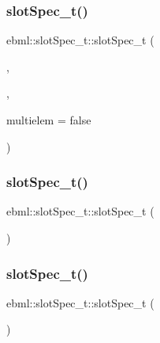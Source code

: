 \mbox{\label{classebml_1_1slotSpec__t_a1d4e4264361ead0bccae5b28c7ba275b}} 
\subsubsection{\texorpdfstring{slot\+Spec\+\_\+t()}{slotSpec\_t()}\hspace{0.1cm}{\footnotesize\ttfamily [2/4]}}
{\footnotesize\ttfamily ebml\+::slot\+Spec\+\_\+t\+::slot\+Spec\+\_\+t (\begin{DoxyParamCaption}\item[{const std\+::string \&}]{,  }\item[{const \mbox{\hyperlink{namespaceebml_abf07998998c284c9be3f76b5d9e192e1}{child\+Class\+Spec\+Arg\+\_\+l}} \&}]{,  }\item[{bool}]{multielem = {\ttfamily false} }\end{DoxyParamCaption})}

\mbox{\label{classebml_1_1slotSpec__t_a98310fdebfa88812dcceaec3af20fe4b}} 
\subsubsection{\texorpdfstring{slot\+Spec\+\_\+t()}{slotSpec\_t()}\hspace{0.1cm}{\footnotesize\ttfamily [3/4]}}
{\footnotesize\ttfamily ebml\+::slot\+Spec\+\_\+t\+::slot\+Spec\+\_\+t (\begin{DoxyParamCaption}\item[{const \mbox{\hyperlink{classebml_1_1slotSpec__t}{slot\+Spec\+\_\+t}} \&}]{ }\end{DoxyParamCaption})}

\mbox{\label{classebml_1_1slotSpec__t_acb5cb8f607dae2ec56efbc700a763759}} 
\subsubsection{\texorpdfstring{slot\+Spec\+\_\+t()}{slotSpec\_t()}\hspace{0.1cm}{\footnotesize\ttfamily [4/4]}}
{\footnotesize\ttfamily ebml\+::slot\+Spec\+\_\+t\+::slot\+Spec\+\_\+t (\begin{DoxyParamCaption}\item[{\mbox{\hyperlink{classebml_1_1slotSpec__t}{slot\+Spec\+\_\+t}} \&\&}]{ }\end{DoxyParamCaption})}

